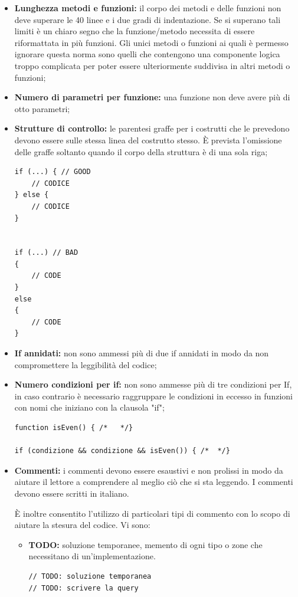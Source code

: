 \begin{itemize}
			\item \textbf{Lunghezza metodi e funzioni:} il corpo dei metodi e delle funzioni non deve superare le 40 linee e i due gradi di indentazione. Se si superano tali limiti è un chiaro segno che la funzione/metodo necessita di essere riformattata in più funzioni. Gli unici metodi o funzioni ai quali è permesso ignorare questa norma sono quelli che contengono una componente logica troppo complicata per poter essere ulteriormente suddivisa in altri metodi o funzioni;
			
			\item \textbf{Numero di parametri per funzione:} una funzione non deve avere più di otto parametri;
			
			\item \textbf{Strutture di controllo:} le parentesi graffe per i costrutti che le prevedono devono essere sulle stessa linea del costrutto stesso. È prevista l'omissione delle graffe soltanto quando il corpo della struttura è di una sola riga;
\begin{lstlisting}
if (...) { // GOOD
	// CODICE
} else {
	// CODICE
}


if (...) // BAD
{
 	// CODE
}
else 
{
	// CODE
}

\end{lstlisting}
			\item \textbf{If annidati:} non sono ammessi più di due if annidati in modo da non compromettere la leggibilità del codice;
			\item \textbf{Numero condizioni per if: } non sono ammesse più di tre condizioni per If, in caso contrario è necessario raggruppare le condizioni in eccesso in funzioni con nomi che iniziano con la clausola "if";
\begin{lstlisting}
function isEven() { /*   */}

if (condizione && condizione && isEven()) { /*  */}

\end{lstlisting}

			\item \textbf{Commenti:} i commenti devono essere esaustivi e non prolissi in modo da aiutare il lettore a comprendere al meglio ciò che si sta leggendo. I commenti devono essere scritti in italiano.
			
			È inoltre consentito l'utilizzo di particolari tipi di commento con lo scopo di aiutare la stesura del codice. Vi sono:
			\begin{itemize}
				\item \textbf{TODO:} soluzione temporanee, memento di ogni tipo o zone che necessitano di un'implementazione.
				\begin{lstlisting}
// TODO: soluzione temporanea
// TODO: scrivere la query
				\end{lstlisting}
				

\end{itemize}
\end{itemize}

